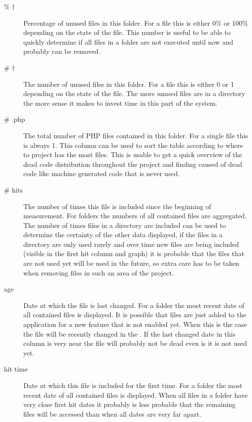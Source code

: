 \begin{description}
\item[\% $\dagger$] Percentage of unused files in this folder. For a file this is either 0\% or 100\% depending on the state of the file. This number is useful to be able to quickly determine if all files in a folder are not executed until now and probably can be removed.
\item[\# $\dagger$] The number of unused files in this folder. For a file this is either 0 or 1 depending on the state of the file. The more unused files are in a directory the more sense it makes to invest time in this part of the system.
\item[\# .php] The total number of PHP files contained in this folder. For a single file this is always 1. This column can be used to sort the table according to where to project has the most files. This is usable to get a quick overview of the dead code distribution throughout the project and finding caused of dead code like machine generated code that is never used.

\item[\# hits] The number of times this file is included since the beginning of measurement. For folders the numbers of all contained files are aggregated. The number of times files in a directory are included can be used to determine the certainty of the other data displayed, if the files in a directory are only used rarely and over time new files are being included (visible in the first hit column and graph) it is probable that the files that are not used yet will be used in the future, so extra care has to be taken when removing files in such an area of the project. 

\item[age] Date at which the file is last changed. For a folder the most recent date of all contained files is displayed. It is possible that files are just added to the application for a new feature that is not enabled yet. When this is the case the file will be recently changed in the \vcs. If the last changed date in this column is very near the file will probably not be dead even is it is not used yet.

\item[hit time] Date at which this file is included for the first time. For a folder the most recent date of all contained files is displayed. When all files in a folder have very close first hit dates it probably is less probable that the remaining files will be accessed than when all dates are very far apart.

\end{description}

